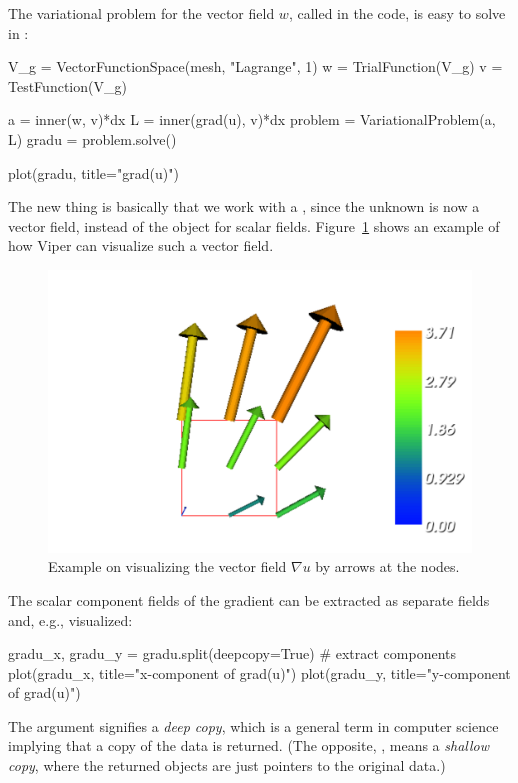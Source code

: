The variational problem for the vector field $w$, called 
in the code, is easy to solve in \fenics:
\begin{python}
V_g = VectorFunctionSpace(mesh, "Lagrange", 1)
w = TrialFunction(V_g)
v = TestFunction(V_g)

a = inner(w, v)*dx
L = inner(grad(u), v)*dx
problem = VariationalProblem(a, L)
gradu = problem.solve()

plot(gradu, title="grad(u)")
\end{python}
The new thing is basically that we work with a
, since the unknown is now a vector
field, instead of the  object for scalar fields.
Figure~\ref{tut:poisson:2D:fig:ex1:gradu} shows an example of how Viper
can visualize such a vector field.

\begin{figure}
  \center\includegraphics[width=\largefig]{chapters/langtangen/pdf/ex1_gradu.pdf}
  \caption{Example on visualizing the vector field
    $\nabla u$ by arrows at the nodes.}
  \label{tut:poisson:2D:fig:ex1:gradu}
\end{figure}

The scalar component fields of the gradient can be extracted as separate
fields and, e.g., visualized:
\begin{python}
gradu_x, gradu_y = gradu.split(deepcopy=True)  # extract components
plot(gradu_x, title="x-component of grad(u)")
plot(gradu_y, title="y-component of grad(u)")
\end{python}
The  argument signifies a \emph{deep copy}, which
is a general term in computer science implying that a copy of the data
is returned. (The opposite, , means a \emph{shallow
copy}, where the returned objects are just pointers to the original data.)

